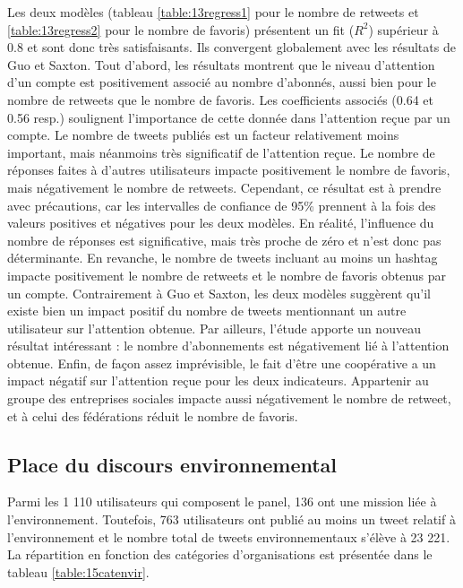         Les deux modèles (tableau \ref{table:13regress1} pour le nombre de retweets et \ref{table:13regress2} pour le nombre de favoris) présentent un fit ($R^2$) supérieur à 0.8 et sont donc très satisfaisants. Ils convergent globalement avec les résultats de Guo et Saxton. Tout d’abord, les résultats montrent que le niveau d’attention d’un compte est positivement associé au nombre d’abonnés, aussi bien pour le nombre de retweets que le nombre de favoris. Les coefficients associés (0.64 et 0.56 resp.) soulignent l’importance de cette donnée dans l’attention reçue par un compte. Le nombre de tweets publiés est un facteur relativement moins important, mais néanmoins très significatif de l’attention reçue. Le nombre de réponses faites à d’autres utilisateurs impacte positivement le nombre de favoris, mais négativement le nombre de retweets. Cependant, ce résultat est à prendre avec précautions, car les intervalles de confiance de 95\% prennent à la fois des valeurs positives et négatives pour les deux modèles. En réalité, l’influence du nombre de réponses est significative, mais très proche de zéro et n’est donc pas déterminante. En revanche, le nombre de tweets incluant au moins un hashtag impacte positivement le nombre de retweets et le nombre de favoris obtenus par un compte. Contrairement à Guo et Saxton, les deux modèles suggèrent qu’il existe bien un impact positif du nombre de tweets mentionnant un autre utilisateur sur l’attention obtenue. Par ailleurs, l’étude apporte un nouveau résultat intéressant : le nombre d’abonnements est négativement lié à l’attention obtenue. Enfin, de façon assez imprévisible, le fait d’être une coopérative a un impact négatif sur l’attention reçue pour les deux indicateurs. Appartenir au groupe des entreprises sociales impacte aussi négativement le nombre de retweet, et à celui des fédérations réduit le nombre de favoris.


    \subsection{Place du discours environnemental}

        Parmi les 1 110 utilisateurs qui composent le panel, 136 ont une mission liée à l’environnement. Toutefois, 763 utilisateurs ont publié au moins un tweet relatif à l’environnement et le nombre total de tweets environnementaux s’élève à 23 221. La répartition en fonction des catégories d’organisations est présentée dans le tableau \ref{table:15catenvir}.


